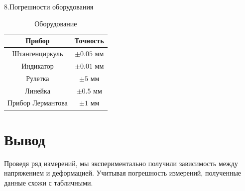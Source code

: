 \documentclass[a4paper, 12pt]{article}
\begin{document}
8.Погрешности оборудования

    \begin{table}[h]
        \centering
        \caption{Оборудование}
        \begin{tabular}{|c|c|}
        \hline
        Прибор         & Точность \\ \hline
        Штангенциркуль & $\pm 0.05$ мм \\ \hline
        Индикатор      & $\pm 0.01$ мм \\ \hline
        Рулетка        & $\pm 5$ мм \\ \hline
        Линейка        & $\pm 0.5$ мм \\ \hline
        Прибор Лермантова & $\pm 1$ мм \\ \hline
        \end{tabular}
    \end{table}


\section{Вывод}
Проведя ряд измерений, мы экспериментально получили зависимость между напряжением и деформацией. Учитывая погрешность измерений, полученные данные схожи с табличными.
\end{document}
